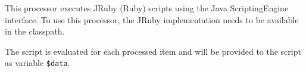 This processor executes JRuby (Ruby) scripts using the Java
ScriptingEngine interface. To use this processor, the JRuby
implementation needs to be available in the classpath.

The script is evaluated for each processed item and will be provided to
the script as variable \texttt{\$data}.

\begin{table}[h]
\end{table}
